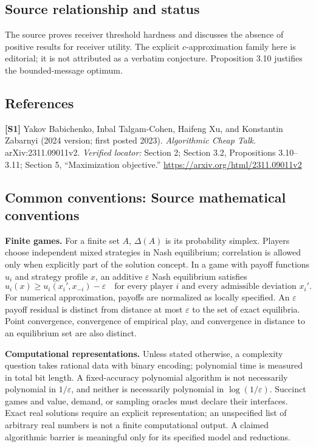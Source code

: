 \documentclass[11pt,a4paper]{article}
\begin{document}
\subsection*{Source relationship and status}
The source proves receiver threshold hardness and discusses the absence of positive results for receiver utility. The explicit $c$-approximation family here is editorial; it is not attributed as a verbatim conjecture. Proposition 3.10 justifies the bounded-message optimum.
\subsection*{References}
\begingroup\footnotesize\raggedright
\textbf{[S1]} Yakov Babichenko, Inbal Talgam-Cohen, Haifeng Xu, and Konstantin Zabarnyi (2024 version; first posted 2023). \emph{Algorithmic Cheap Talk}. arXiv:2311.09011v2. \textit{Verified locator:} Section 2; Section 3.2, Propositions 3.10--3.11; Section 5, ``Maximization objective.'' \url{https://arxiv.org/html/2311.09011v2}
\par\endgroup

\subsection*{Common conventions: Source mathematical conventions}

\textbf{Finite games.} For a finite set $A$, $\Delta(A)$ is its probability
simplex. Players choose independent mixed strategies in Nash equilibrium;
correlation is allowed only when explicitly part of the solution concept.
In a game with payoff functions $u_i$ and strategy profile $x$, an additive
$\varepsilon$ Nash equilibrium satisfies
\[
 u_i(x)\geq u_i(x_i',x_{-i})-\varepsilon
 \quad\text{for every player $i$ and every admissible deviation $x_i'$}.
\]
For numerical approximation, payoffs are normalized as locally specified.
An $\varepsilon$ payoff residual is distinct from distance at most
$\varepsilon$ to the set of exact equilibria. Point convergence, convergence
of empirical play, and convergence in distance to an equilibrium set are
also distinct.

\textbf{Computational representations.} Unless stated otherwise, a complexity
question takes rational data with binary encoding; polynomial time is measured
in total bit length. A fixed-accuracy polynomial algorithm is not necessarily
polynomial in $1/\varepsilon$, and neither is necessarily polynomial in
$\log(1/\varepsilon)$. Succinct games and value, demand, or sampling oracles
must declare their interfaces. Exact real solutions require an explicit
representation; an unspecified list of arbitrary real numbers is not a
finite computational output. A claimed algorithmic barrier is meaningful
only for its specified model and reductions.
\end{document}
